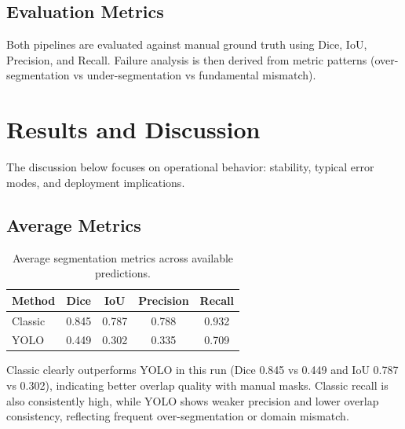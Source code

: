 \documentclass[11pt,a4paper]{article}
\begin{document}
\subsection*{Evaluation Metrics}
Both pipelines are evaluated against manual ground truth using Dice, IoU, Precision, and Recall. Failure analysis is then derived from metric patterns (over-segmentation vs under-segmentation vs fundamental mismatch).

\section*{Results and Discussion}
The discussion below focuses on operational behavior: stability, typical error modes, and deployment implications.

\subsection*{Average Metrics}
\begin{table}[H]
\centering
\begin{tabular}{lcccc}
\toprule
Method & Dice & IoU & Precision & Recall \\
\midrule
Classic & 0.845 & 0.787 & 0.788 & 0.932 \\
YOLO & 0.449 & 0.302 & 0.335 & 0.709 \\
\bottomrule
\end{tabular}
\caption{Average segmentation metrics across available predictions.}
\end{table}
Classic clearly outperforms YOLO in this run (Dice 0.845 vs 0.449 and IoU 0.787 vs 0.302), indicating better overlap quality with manual masks.
Classic recall is also consistently high, while YOLO shows weaker precision and lower overlap consistency, reflecting frequent over-segmentation or domain mismatch.
\end{document}
